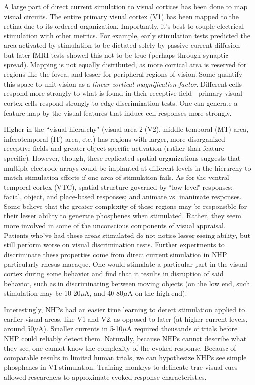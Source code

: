 A large part of direct current simulation to visual cortices has been done to map visual circuits. The entire primary visual cortex (V1) has been mapped to the retina due to its ordered organization. Importantly, it's best to couple electrical stimulation with other metrics. For example, early stimulation tests predicted the area activated by stimulation to be dictated solely by passive current diffusion---but later fMRI tests showed this not to be true (perhaps through synaptic spread). Mapping is not equally distributed, as more cortical area is reserved for regions like the fovea, and lesser for peripheral regions of vision. Some quantify this space to unit vision as a \textit{linear cortical magnification factor}. Different cells respond more strongly to what is found in their receptive field---primary visual cortex cells respond strongly to edge discrimination tests. One can generate a feature map by the visual features that induce cell responses more strongly.\newline

Higher in the ``visual hierarchy" (visual area 2 (V2), middle temporal (MT) area, inferotemporal (IT) area, etc.) has regions with larger, more disorganized receptive fields and greater object-specific activation (rather than feature specific). However, though, these replicated spatial organizations suggests that multiple electrode arrays could be implanted at different levels in the hierarchy to match stimulation effects if one area of stimulation fails. As for the ventral temporal cortex (VTC), spatial structure governed by ``low-level" responses; facial, object, and place-based responses; and animate vs. inanimate responses. Some believe that the greater complexity of these regions may be responsible for their lesser ability to generate phosphenes when stimulated. Rather, they seem more involved in some of the unconscious components of visual appraisal. Patients who've had these areas stimulated do not notice lesser seeing ability, but still perform worse on visual discrimination tests. Further experiments to discriminate these properties come from direct current simulation in NHP, particularly rhesus macaque. One would stimulate a particular part in the visual cortex during some behavior and find that it results in disruption of said behavior, such as in discriminating between moving objects (on the low end, such stimulation may be 10-20$\mu$A, and 40-80$\mu$A on the high end).\newline

Interestingly, NHPs had an easier time learning to detect stimulation applied to earlier visual areas, like V1 and V2, as opposed to later (at higher current levels, around 50$\mu$A). Smaller currents in 5-10$\mu$A required thousands of trials before NHP could reliably detect them. Naturally, because NHPs cannot describe what they see, one cannot know the complexity of the evoked response. Because of comparable results in limited human trials, we can hypothesize NHPs see simple phosphenes in V1 stimulation. Training monkeys to delineate true visual cues allowed researchers to approximate evoked response characteristics.\newline

